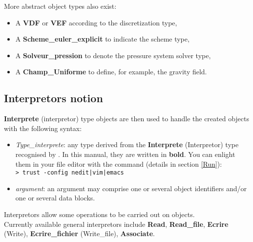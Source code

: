 More abstract object types also exist:

\begin{itemize}
\item A \textbf{VDF} or \textbf{VEF} according to the discretization type,
\item A \textbf{Scheme\_euler\_explicit} to indicate  the scheme type,
\item A \textbf{Solveur\_pression} to denote the pressure system solver type,
\item A \textbf{Champ\_Uniforme} to define, for example, the gravity field.
\end{itemize}



\subsection{Interpretors notion}
\textbf{Interprete } (interpretor) type objects are then used to handle the created objects with the following syntax:
    \begin{center}
    \end{center}

\begin{itemize}
\item \textit{Type\_interprete}: any type derived from the \textbf{Interprete} (Interpretor) type recognised by \trust. In this manual, they are written in \textbf{bold}. You can enlight them in your file editor with the command (details in section \ref{Run}):\\
\texttt{> trust -config nedit|vim|emacs}
\item \textit{argument}: an argument may comprise one or several object identifiers and/or one or several data blocks.
\end{itemize}

Interpretors allow some operations to be carried out on objects.\\

Currently available general interpretors include \textbf{Read}, \textbf{Read\_file}, \textbf{Ecrire} (Write), \textbf{Ecrire\_fichier} (Write\_file), \textbf{Associate}.



